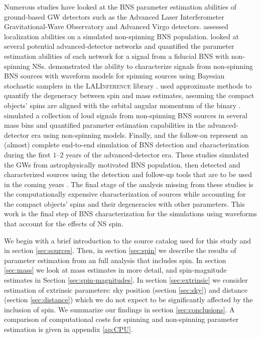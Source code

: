 Numerous studies have looked at the BNS parameter estimation abilities of ground-based GW detectors such as the Advanced Laser Interferometer Gravitational-Wave Observatory \citep[aLIGO;][]{Aasi_2015} and Advanced Virgo \citep[AdV;][]{Acernese_2014} detectors. \citet{Nissanke_2010,Nissanke_2011} assessed localization abilities on a simulated non-spinning BNS population. \citet{Veitch_2012} looked at several potential advanced-detector networks and quantified the parameter estimation abilities of each network for a signal from a fiducial BNS with non-spinning NSs. \citet{Aasi_2013} demonstrated the ability to characterize signals from non-spinning BNS sources with waveform models for spinning sources using Bayesian stochastic samplers in the \textsc{LALInference} library \citep{Veitch_2014}.  \citet{Hannam_2013} used approximate methods to quantify the degeneracy between spin and mass estimates, assuming the compact objects' spins are aligned with the orbital angular momentum of the binary \citep[but see][]{Haster_2015}. \citet{Rodriguez_2014} simulated a collection of loud signals from non-spinning BNS sources in several mass bins and quantified parameter estimation capabilities in the advanced-detector era using non-spinning models.  Finally, \citet{Singer_2014} and the follow-on \citet{Berry_2014} represent an (almost) complete end-to-end simulation of BNS detection and characterization during the first $1$--$2$ years of the advanced-detector era. These studies simulated the GWs from astrophysically motivated BNS population, then detected and characterized sources using the detection and follow-up tools that are to be used in the coming years \citep{WhitePaper}.   The final stage of the analysis missing from these studies is the computationally expensive characterization of sources while accounting for the compact objects' spins and their degeneracies with other parameters.  This work is the final step of BNS characterization for the \citet{Singer_2014} simulations using waveforms that account for the effects of NS spin.

We begin with a brief introduction to the source catalog used for this study and \citet{Singer_2014} in section \ref{sec:sources}. Then, in section \ref{sec:spin} we describe the results of parameter estimation from an full analysis that includes spin. In section \ref{sec:mass} we look at mass estimates in more detail, and spin-magnitude estimates in Section \ref{sec:spin-magnitudes}. In section \ref{sec:extrinsic} we consider estimation of extrinsic parameters: sky position (section \ref{sec:sky}) and distance (section \ref{sec:distance}) which we do not expect to be significantly affected by the inclusion of spin. We summarize our findings in section \ref{sec:conclusions}. A comparison of computational costs for spinning and non-spinning parameter estimation is given in appendix \ref{ap:CPU}.

  
  
  
  
  
  
  
  
  
